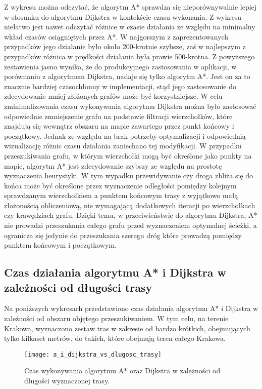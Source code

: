 Z wykresu można odczytać, że algorytm A* sprawdza się nieporównywalnie lepiej w stosunku do algorytmu Dijkstra w kontekście czasu wykonania. Z wykresu niełatwo jest nawet odczytać różnice w czasie działania ze względu na minimalny wkład czasów osiągniętych przez A*. W najgorszym z zaprezentowanych przypadków jego działanie było około 200-krotnie szybsze, zaś w najlepszym z przypadków różnica w prędkości działania była prawie 500-krotna. Z powyższego zestawienia jasno wynika, że do produkcyjnego zastosowania w aplikacji, w porównaniu z algorytmem Dijkstra, nadaje się tylko algorytm A*. Jest on za to znacznie bardziej czasochłonny w implementacji, stąd jego zastosowanie do zdecydowanie mniej złożonych grafów może być korzystniejsze. W celu zminimalizowania czasu wykonywania algorytmu Dijkstra można było zastosować odpowiednie zmniejszenie grafu na podstawie filtracji wierzchołków, które znajdują się wewnątrz obszaru na mapie zawartego przez punkt końcowy i początkowy. Jednak ze względu na brak potrzeby optymalizacji i odpowiednią wizualizację różnic czasu działania zaniechano tej modyfikacji.
W przypadku przeszukiwania grafu, w którym wierzchołki mogą być określone jako punkty na mapie, algorytm A* jest zdecydowanie szybszy ze względu na prostotę wyznaczenia heurystyki. W tym wypadku przewidywanie czy droga zbliża się do końca może być określone przez wyznaczenie odległości pomiędzy kolejnym sprawdzanym wierzchołkiem a punktem końcowym trasy z wyjątkowo małą złożonością obliczeniową, nie wymagającą dodatkowych iteracji po wierzchołkach czy krawędziach grafu. Dzięki temu, w przeciwieństwie do algorytmu Dijkstra, A* nie prowadzi przeszukania całego grafu przed wyznaczeniem optymalnej ścieżki, a ogranicza się jedynie do przeszukania szeregu dróg które prowadzą pomiędzy punktem końcowym i początkowym. \newline

\subsection{Czas działania algorytmu A* i Dijkstra w zależności od długości trasy}

Na poniższych wykresach przedstawiono czas działania algorytmu A* i Dijkstra w zależności od obszaru objętego przeszukiwaniem. W tym celu, na terenie Krakowa, wyznaczono zestaw tras w zakresie od bardzo krótkich, obejmujących tylko kilkaset metrów, do takich, które obejmują teren całego Krakowa.

\begin{figure}[H]
\centering
\texttt{[image: a\_i\_dijkstra\_vs\_dlugosc\_trasy]}
\caption{Czas wykonywania algorytmu A* oraz Dijkstra w zależności od długości wyznaczonej trasy.}
\end{figure}


